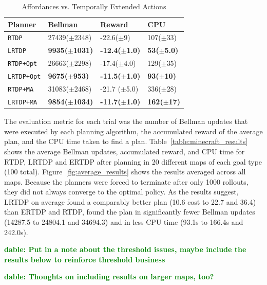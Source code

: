 \documentclass[letterpaper]{article}
\newcommand{\dnote}[1]{\textcolor{Green}{\textbf{dable:  #1}}}
\newcommand{\ra}[1]{\renewcommand{\arraystretch}{#1}} %
\begin{document}
\begin{table}[b]
\ra{1.3}
\begin{tabular}{@{}llll@{}}\toprule
Planner & Bellman & Reward & CPU \\ \midrule
\texttt{RTDP}   			&	27439($\pm$2348)	&	-22.6($\pm$9)& 107($\pm$33) \\
\texttt{LRTDP} 			& 	{\bf 9935($\pm$1031)}	&	{\bf -12.4($\pm$1.0)}& \bf{53}($\pm$5.0) \\ \hline
\texttt{RTDP+Opt}  		&	26663($\pm$2298)	&	-17.4($\pm$4.0) & 129($\pm$35) \\
\texttt{LRTDP+Opt} 		& 	\bf{9675}($\pm$953)	&	\bf{-11.5}($\pm$1.0)&{\bf 93($\pm$10)} \\ \hline
\texttt{RTDP+MA}  		&	31083($\pm$2468)	&	-21.7	($\pm$5.0)&336($\pm$28) \\
\texttt{LRTDP+MA}  		& 	{\bf 9854($\pm$1034)}	&	{\bf -11.7($\pm$1.0)}&{\bf 162($\pm$17)} \\ %
\bottomrule
\end{tabular}
\label{table:temp_ext_act_results}
\caption{Affordances vs. Temporally Extended Actions}
\end{table}

The evaluation metric for each trial was the number of Bellman updates
that were executed by each planning algorithm, the accumulated reward of the average plan,
and the CPU time taken to find a plan. Table~\ref{table:minecraft_results} shows the average Bellman updates, accumulated reward, and CPU time
for RTDP, LRTDP and ERTDP after planning in 20 different maps of each goal type (100 total). Figure~\ref{fig:average_results} shows the results averaged across all maps. Because the planners were forced to terminate after only 1000 rollouts, they did not always converge to the optimal policy. As the results suggest, LRTDP on average found a comparably better plan (10.6 cost to 22.7 and 36.4) than ERTDP and RTDP, found the plan in significantly fewer Bellman updates (14287.5 to 24804.1 and 34694.3) and in less CPU time (93.1s to 166.4s and 242.0s).

\dnote{Put in a note about the threshold issues, maybe include the results below to reinforce threshold business}

\dnote{Thoughts on including results on larger maps, too?}
\end{document}
